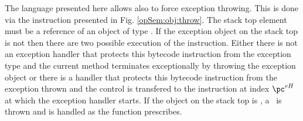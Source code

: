 \begin{figure}[ht!]
\end{figure}



The language presented here allows also to force  exception throwing. This is done via the
 instruction \athrow{} presented in Fig. \ref{opSem:obj:throw}.    The stack top element  must be a reference of an object of type  \Throwable. 
	 If the exception object on the stack top is not \Mynull{} then there are two possible execution of the instruction.
	  Either there is not an exception handler  that protects this bytecode instruction from the 
	  exception type and the current method \methodd{} terminates exceptionally by throwing the exception object \stackOnlyParam{\counterOnly} or
	   there is a handler that protects this bytecode instruction from the exception thrown and the control is transfered
	  to the instruction at index $\pc^{eH}$  at which the exception handler starts. %
	  If the object on the stack top is \Mynull, a \NullPointerExc \ is thrown and is handled as the function \getStateAfterExc{} prescribes. 

